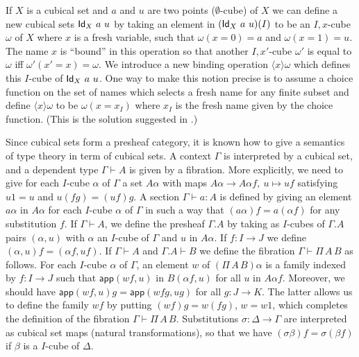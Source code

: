 \documentclass[10pt,a4paper]{article}
\newcommand{\Id}{{\sf Id}}
\newcommand{\app}{\mathsf{app}}
\newcommand{\set}[1]{\{#1\}}
\newcommand{\es}{\emptyset}
\newcommand{\bind}[2]{{\langle}#1{\rangle}#2}
\begin{document}
 If $X$ is a cubical set and $a$ and $u$ are two points ($\es$-cube) of $X$ we can define a new cubical sets $\Id_X~a~u$
by taking an element in $(\Id_X~a~u)(I)$ to be an $I,x$-cube $\omega$ of $X$ where $x$ is
a fresh variable, such that $\omega(x=0) = a$ and $\omega(x=1) = u$. The name $x$ is ``bound''
in this operation so that another $I,x'$-cube $\omega'$ is equal to $\omega$
iff $\omega'(x'=x) = \omega$.
We introduce a new binding operation $\bind{x}{\omega}$ which defines this $I$-cube of $\Id_X~a~u$.
One way to make this notion precise is to assume a choice function
on the set of names which selects a fresh name for any finite subset and define $\bind{x}{\omega}$ to be $\omega (x=x_I)$ where
$x_I$ is the fresh name given by the choice function. (This is the solution suggested in \cite{Stoughton}.)

 Since cubical sets form a presheaf category, it is known how to give a semantics of type theory in term of cubical sets.
A context $\Gamma$ is interpreted by a cubical set, and a dependent type $\Gamma\vdash A$ is given by a fibration.
More explicitly,
we need to give for each $I$-cube $\alpha$ of $\Gamma$ a set $A\alpha$
with maps $A\alpha\to A\alpha f,~u\longmapsto uf$ satisfying $u1 = u$ and $u(fg) = (uf)g$.
A section $\Gamma\vdash a:A$ is defined by giving an element $a\alpha$ in $A\alpha$ for each
$I$-cube $\alpha$ of $\Gamma$ in such a way that $(a\alpha) f = a (\alpha f)$ for any substitution $f$.
If $\Gamma\vdash A$, we define the presheaf $\Gamma.A$ by taking as $I$-cubes of $\Gamma.A$
pairs $(\alpha,u)$ with $\alpha$ an $I$-cube of $\Gamma$ and $u$ in $A\alpha$. If $f:I\to J$ we define
$(\alpha,u)f = (\alpha f,u f)$. If $\Gamma\vdash A$ and $\Gamma.A\vdash B$ we define
the fibration $\Gamma\vdash \Pi\,A\,B$ as follows.
For each $I$-cube $\alpha$ of $\Gamma$, an element $w$ of $(\Pi\,A\,B)\alpha$ is a family
indexed by $f:I\to J$ such that $\app(wf,u)$ in $B(\alpha f,u)$ for all $u$ in $A\alpha f$.
Moreover, we should have $\app(wf,u)g = \app(wfg,ug)$ for all $g:J\to K$. The latter
allows us to define the family $wf$ by putting $(wf)g = w(fg)$, $w=w1$,
which completes the definition of the fibration $\Gamma\vdash \Pi\,A\,B$.
Substitutions $\sigma:\Delta\to\Gamma$ are interpreted as cubical set maps
(natural transformations), so that we have $(\sigma\beta)f = \sigma(\beta f)$ if $\beta$ is a $I$-cube of
$\Delta$.
\end{document}
